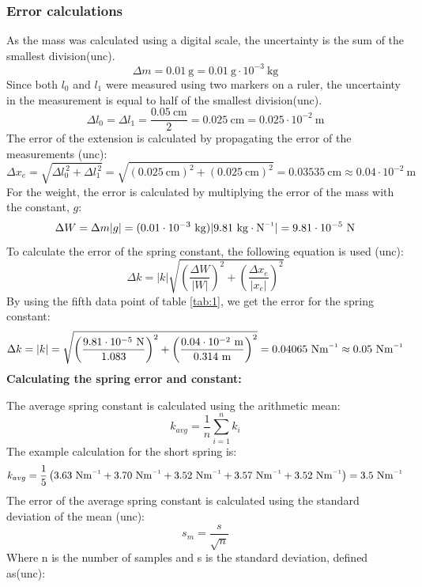 \documentclass[a4paper, 10pt]{article}
\newcommand{\inv}{^{\raisebox{.2ex}{$\scriptscriptstyle-1$}}}
\newcommand{\unit}[1]{~\mathrm{#1}}
\begin{document}
\begin{justify}
\subsubsection{Error calculations}
As the mass was calculated using a digital scale, the uncertainty is the sum of
the smallest division(unc).
\[ \Delta m = 0.01\unit{g} = 0.01\unit{g} \cdot 10^{-3}\unit{kg}\]
Since both $l_0$ and $l_1$ were measured using two markers on a ruler, the
uncertainty in the measurement is equal to half of the smallest division(unc).
\[ \Delta l_0 = \Delta l_1 = \frac{0.05\unit{cm}}{2} = 0.025\unit{cm} =
0.025 \cdot 10^{-2}\unit{m} \]
The error of the extension is calculated by propagating the error of the
measurements (unc):
\[ \Delta x_e = \sqrt{\Delta l_0 ^{\,2} + \Delta l_1 ^{\,2}} =
\sqrt{(0.025\unit{cm})^2 + (0.025\unit{cm})^2} = 0.03535\unit{cm}
\approx 0.04 \cdot 10^{-2}\unit{m}\]
For the weight, the error is calculated by multiplying the error of the mass
with the constant, $g$:
\[\Delta W = \Delta m |g| = (0.01 \cdot 10^{-3}\unit{kg})|9.81~
\mathrm{kg \cdot N\inv}| = 9.81 \cdot 10^{-5}\unit{N}\]
To calculate the error of the spring constant, the following equation is used (unc):
\begin{equation}
    \Delta k = |k|\sqrt{\left(\frac{\Delta W}{|W|}\right)^2 + \left( \frac{\Delta x_e}{|x_e|}\right) ^2}
\end{equation}
By using the fifth data point of table \ref{tab:1}, we get the error for the
spring constant:
\[ \Delta k = \left| k \right| = \sqrt{\left(\frac{9.81 \cdot 10
^{-5}\unit{N}}{1.083}\right) ^ 2 + \left(\frac{0.04 \cdot 10^
{-2}\unit{m}}{0.314\unit{m}}\right) ^ 2 } = 0.04065 \unit{N m\inv}
\approx 0.05\unit{N m\inv}\]
\newpage
\textbf{Calculating the spring error and constant:}
\par
The average spring constant is calculated using the arithmetic mean:
\begin{equation}
    k_{avg} = \frac{1}{n} \sum_{i=1}^{n} k_i
\end{equation}
The example calculation for the short spring is:
\[k_{avg}  = \frac{1}{5}\left(3.63\unit{N m\inv}+ 3.70\unit{N m\inv} +
3.52\unit{N m\inv} + 3.57\unit{N m\inv} + 3.52\unit{N m\inv} \right)  =
3.5\unit{N m\inv}\]
The error of the average spring constant is calculated using the standard
deviation of the mean (unc):
\begin{equation}
s_m = \frac{s}{\sqrt{n}}
\end{equation}
Where n is the number of samples and s is the standard deviation, defined
as(unc):
\begin{equation}

\end{equation}
\end{justify}
\end{document}
